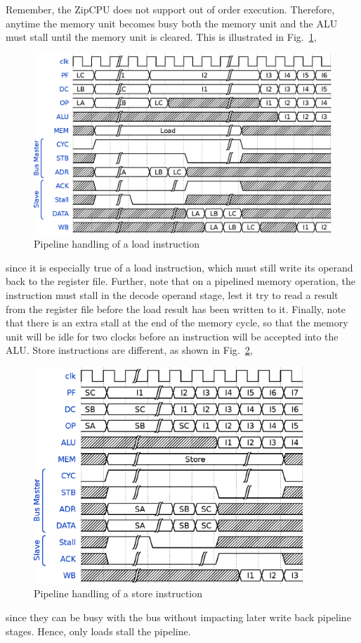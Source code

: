 \documentclass{gqtekspec}
\begin{document}
\begin{itemize}
Remember, the ZipCPU does not support out of order execution.  Therefore,
anytime the memory unit becomes busy both the memory unit and the ALU must
stall until the memory unit is cleared.  This is illustrated in
Fig.~\ref{fig:memrd},
\begin{figure}\begin{center}
\includegraphics[width=5.6in]{../gfx/memrd.eps}
\caption{Pipeline handling of a load instruction}\label{fig:memrd}
\end{center}\end{figure}
since it is especially true of a load
instruction, which must still write its operand back to the register file.
Further, note that on a pipelined memory operation, the instruction must
stall in the decode operand stage, lest it try to read a result from the
register file before the load result has been written to it.  Finally, note
that there is an extra stall at the end of the memory cycle, so that
the memory unit will be idle for two clocks before an instruction will be
accepted into the ALU.  Store instructions are different, as shown in
Fig.~\ref{fig:memwr},
\begin{figure}\begin{center}
\includegraphics[width=4in]{../gfx/memwr.eps}
\caption{Pipeline handling of a store instruction}\label{fig:memwr}
\end{center}\end{figure}
since they can be busy with the bus without impacting later write back
pipeline stages.  Hence, only loads stall the pipeline.


\end{itemize}
\end{document}
